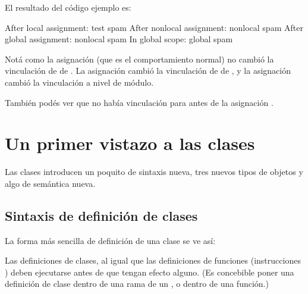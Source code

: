 \documentclass[a4,10pt,spanish]{sphinxmanual}
\begin{document}
\sphinxAtStartPar
El resultado del código ejemplo es:

\begin{sphinxVerbatim}[commandchars=\\\{\}]
After local assignment: test spam
After nonlocal assignment: nonlocal spam
After global assignment: nonlocal spam
In global scope: global spam
\end{sphinxVerbatim}

\sphinxAtStartPar
Notá como la asignación  (que es el comportamiento normal) no cambió la vinculación de  de .  La asignación  cambió la vinculación de  de , y la asignación  cambió la vinculación a nivel de módulo.

\sphinxAtStartPar
También podés ver que no había vinculación para  antes de la asignación .


\section{Un primer vistazo a las clases}
\label{\detokenize{tutorial/classes:a-first-look-at-classes}}\label{\detokenize{tutorial/classes:tut-firstclasses}}
\sphinxAtStartPar
Las clases introducen un poquito de sintaxis nueva, tres nuevos tipos de objetos y algo de semántica nueva.


\subsection{Sintaxis de definición de clases}
\label{\detokenize{tutorial/classes:class-definition-syntax}}\label{\detokenize{tutorial/classes:tut-classdefinition}}
\sphinxAtStartPar
La forma más sencilla de definición de una clase se ve así:

\begin{sphinxVerbatim}[commandchars=\\\{\}]
 
\end{sphinxVerbatim}

\sphinxAtStartPar
Las definiciones de clases, al igual que las definiciones de funciones (instrucciones ) deben ejecutarse antes de que tengan efecto alguno.  (Es concebible poner una definición de clase dentro de una rama de un , o dentro de una función.)
\end{document}
